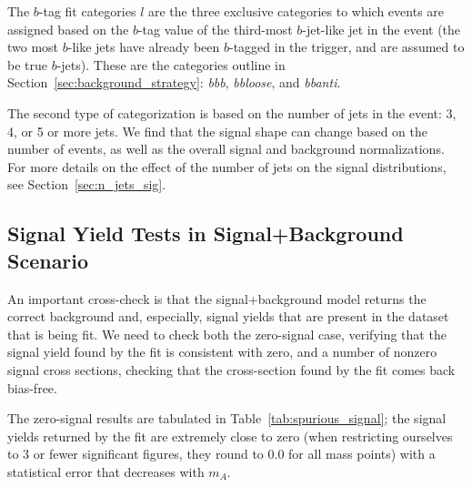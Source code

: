 The $b$-tag fit categories $l$ are the three exclusive categories to which events are assigned
based on the $b$-tag value of the third-most $b$-jet-like jet in the event (the two most
$b$-like jets have already been $b$-tagged in the trigger, and are assumed to be true
$b$-jets).  These are the categories outline in Section~\ref{sec:background_strategy}: 
\textit{bbb}, \textit{bbloose}, and \textit{bbanti}. 




The second type of categorization is based on the number of 
jets in the event: 3, 4, or 5 or more jets.  We find that the signal
shape can change based on the number of events, as well as the overall
signal and background normalizations.  For more details on the effect of 
the number of jets on the signal distributions, see Section~\ref{sec:n_jets_sig}. 



\subsection{Signal Yield Tests in Signal+Background Scenario}
An important cross-check is that the signal+background model returns the correct background
and, especially, signal yields that are present in the dataset that is being fit.
We need to check both the zero-signal case, verifying that the signal yield found
by the fit is consistent with zero, and a number of nonzero signal cross sections,
checking that the cross-section found by the fit comes back bias-free. 

The zero-signal results are tabulated in Table~\ref{tab:spurious_signal}; the 
signal yields returned by the fit are extremely close to zero (when restricting
ourselves to 3 or fewer significant figures, they round to 0.0 for all mass points)
with a statistical error that decreases with $m_A$.


